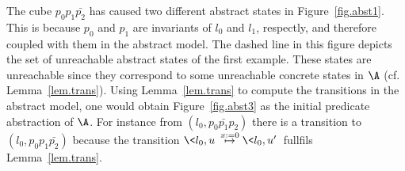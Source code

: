\documentclass{eptcs}
\begin{document}
\noindent
The cube $p_0 p_1 \bar{p_2}$ has caused two
different abstract states in Figure~\ref{fig.abst1}. This is because $p_0$ and $p_1$ are invariants of 
$l_0$ and $l_1$, respectly, and therefore coupled with them in the abstract model.
The dashed line in this figure depicts the set of unreachable
abstract states of the first example. These states are unreachable since they correspond to some 
unreachable concrete states in $\A$ (cf. Lemma~\ref{lem.trans}).
Using Lemma~\ref{lem.trans} to compute the transitions in the abstract model, 
one would obtain Figure~\ref{fig.abst3} as the initial predicate abstraction
of $\A$. For instance from $(l_0,p_0\bar{p_1}p_2)$ there is a transition to
$(l_0,p_0p_1\bar{p_2})$ because the transition $\<l_0,u\>
\stackrel{x:=0}{\mapsto}\< l_0,u'\>$ fullfils  Lemma~\ref{lem.trans}.
\end{document}

